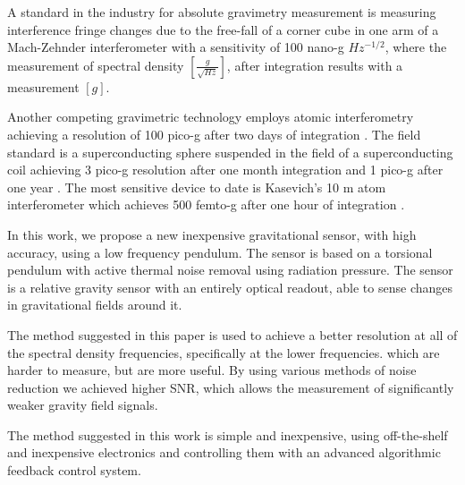 \documentclass[\main/master.tex]{subfiles}
\begin{document}
\fi
\par\noindent
A standard in the industry for absolute gravimetry measurement is measuring interference fringe changes due to the free-fall of a corner cube in one arm of a Mach-Zehnder interferometer with a sensitivity of 100 nano-g $Hz^{-1/2}$, where the measurement of spectral density $[\frac{g}{\sqrt{Hz}}]$, after integration results with a measurement $[g]$.
\par\noindent
Another competing gravimetric technology employs atomic interferometry achieving a resolution of 100 pico-g after two days of integration \cite{Peters01}. The field standard is a superconducting sphere suspended in the field of a superconducting coil achieving 3 pico-g resolution after one month integration and 1 pico-g after one year \cite{Goodkind99}. 
The most sensitive device to date is Kasevich's 10 m atom interferometer which achieves 500 femto-g after one hour of integration \cite{PhysRevA.91.033629,kasevich2014prospects}. 
\par\noindent
In this work, we propose a new inexpensive gravitational sensor, with high accuracy, using a low frequency pendulum. The sensor is based on a torsional pendulum with active thermal noise removal using radiation pressure. The sensor is a relative gravity sensor with an entirely optical readout, able to sense changes in gravitational fields around it. 

\par\noindent
The method suggested in this paper is used to achieve a better resolution at all of the spectral density frequencies, specifically at the lower frequencies. which are harder to measure, but are more useful. By using various methods of noise reduction we achieved higher SNR, which allows the measurement of significantly weaker gravity field signals.
\par\noindent
The method suggested in this work is simple and inexpensive, using off-the-shelf and inexpensive electronics and controlling them with an advanced algorithmic feedback control system.
 
\end{document}
